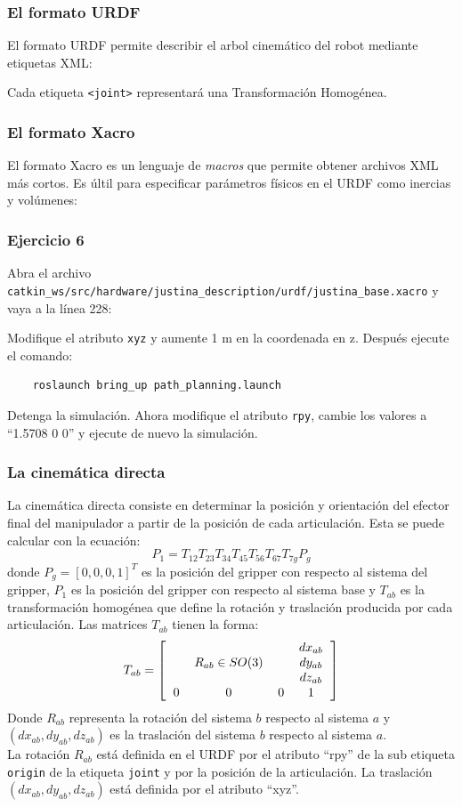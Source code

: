 \begin{frame}[containsverbatim]\frametitle{El formato URDF}
  El formato URDF permite describir el arbol cinemático del robot mediante etiquetas XML:
  \footnotesize
  
  \normalsize
  Cada etiqueta \texttt{<joint>} representará una Transformación Homogénea. 
\end{frame}

\begin{frame}[containsverbatim]\frametitle{El formato Xacro}
  El formato Xacro es un lenguaje de \textit{macros} que permite obtener archivos XML más cortos. Es últil para especificar parámetros físicos en el URDF como inercias y volúmenes:
  \footnotesize
  
\end{frame}

\begin{frame}[containsverbatim]\frametitle{Ejercicio 6}
  Abra el archivo \texttt{catkin\_ws/src/hardware/justina\_description/urdf/justina\_base.xacro} y vaya a la línea 228:
  
  Modifique el atributo \texttt{xyz} y aumente 1 m en la coordenada en z. Después ejecute el comando:
  \begin{lstlisting}
    roslaunch bring_up path_planning.launch
  \end{lstlisting}
  Detenga la simulación. Ahora modifique el atributo \texttt{rpy}, cambie los valores a ``1.5708 0 0'' y ejecute de nuevo la simulación. 
\end{frame}

\begin{frame}\frametitle{La cinemática directa}
  La cinemática directa consiste en determinar la posición y orientación del efector final del manipulador a partir de la posición de cada articulación.  Esta se puede calcular con la ecuación:
  \[P_1 = T_{12}T_{23}T_{34}T_{45}T_{56}T_{67}T_{7g}P_g\]
  donde $P_g = [0,0,0,1]^T$ es la posición del gripper con respecto al sistema del gripper, $P_1$ es la posición del gripper con respecto al sistema base y $T_{ab}$ es la transformación homogénea que define la rotación y traslación producida por cada articulación. Las matrices $T_{ab}$
  tienen la forma:
  \[T_{ab} = \left[\begin{tabular}{cccc}
      & & & $dx_{ab}$\\
      & $R_{ab}\in SO(3)$ & & $dy_{ab}$\\
      & & & $dz_{ab}$\\
      0 & 0& 0 & 1
    \end{tabular}\right]\]
  Donde $R_{ab}$ representa la rotación del sistema $b$ respecto al sistema $a$ y $(dx_{ab}, dy_{ab}, dz_{ab})$ es la traslación del sistema $b$ respecto al sistema $a$.\\
  La rotación $R_{ab}$ está definida en el URDF por el atributo ``rpy'' de la sub etiqueta \texttt{origin} de la etiqueta \texttt{joint} y por la posición de la articulación. La traslación $(dx_{ab}, dy_{ab}, dz_{ab})$ está definida por el atributo ``xyz''. 
\end{frame}

